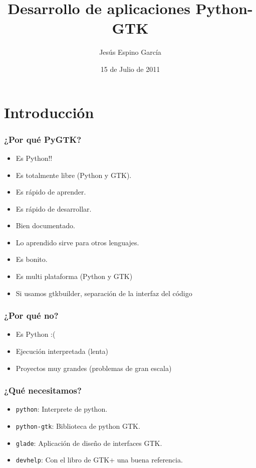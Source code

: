 \documentclass[10pt]{beamer}
\title{Desarrollo de aplicaciones Python-GTK}
\author{Jesús Espino García}
\date{15 de Julio de 2011}
\institute[Python Madrid 2011]{Kaleidos\\Python Madrid 2011}
\begin{document}
  \frame{\maketitle}

  \section{Introducción}
  \begin{frame}[containsverbatim]
    \frametitle{¿Por qué PyGTK?}

    \begin{itemize}
      \item Es Python!!
      \item Es totalmente libre (Python y GTK).
      \item Es rápido de aprender.
      \item Es rápido de desarrollar.
      \item Bien documentado.
      \item Lo aprendido sirve para otros lenguajes.
      \item Es bonito.
      \item Es multi plataforma (Python y GTK)
      \item Si usamos gtkbuilder, separación de la interfaz del código
    \end{itemize}
  \end{frame}
  
  \begin{frame}
    \frametitle{¿Por qué no?}

    \begin{itemize}
      \item Es Python :(
      \item Ejecución interpretada (lenta)
      \item Proyectos muy grandes (problemas de gran escala)
    \end{itemize}
  \end{frame}
  
  \begin{frame}[containsverbatim]
    \frametitle{¿Qué necesitamos?}
  
    \begin{itemize}
      \item \verb+python+: Interprete de python.
      \item \verb+python-gtk+: Biblioteca de python GTK.
      \item \verb+glade+: Aplicación de diseño de interfaces GTK.
      \item \verb+devhelp+: Con el libro de GTK+ una buena referencia.
    \end{itemize}
  \end{frame}
\end{document}

